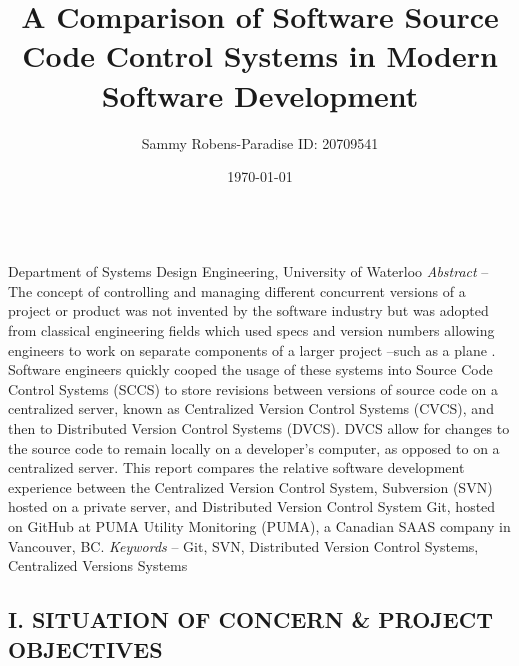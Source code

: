 \documentclass{article}
\title{A Comparison of Software Source Code Control Systems in Modern Software Development}
\author{Sammy Robens-Paradise ID: 20709541}
\date{\today}
\begin{document}
\maketitle
{}\\
\centering
Department of Systems Design Engineering, University of Waterloo
\justify
\textit{Abstract} – The concept of controlling and managing different concurrent versions of a project or product was not invented by the software industry but was adopted from classical engineering fields which used specs and version numbers allowing engineers to work on separate components of a larger project –such as a plane \cite{history-of-version-control}. Software engineers quickly cooped the usage of these systems into Source Code Control Systems (SCCS) to store revisions between versions of source code on a centralized server, known as Centralized Version Control Systems (CVCS), and then to Distributed Version Control Systems (DVCS). DVCS allow for changes to the source code to remain locally on a developer’s computer, as opposed to on a centralized server. This report compares the relative software development experience between the Centralized Version Control System, Subversion (SVN) hosted on a private server, and Distributed Version Control System Git, hosted on GitHub at PUMA Utility Monitoring (PUMA), a Canadian SAAS company in Vancouver, BC.
\justify
\textit{Keywords} – Git, SVN, Distributed Version Control Systems, Centralized Versions Systems
\begin{center}
     \section*{I. SITUATION OF CONCERN \& PROJECT OBJECTIVES} 
\end{center}
\end{document}
